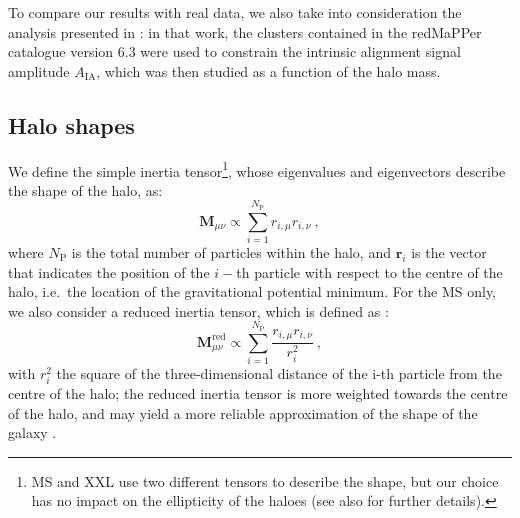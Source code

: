 \documentclass[a4paper,fleqn,usenatbib]{mnras}
\begin{document}
To compare our results with real data, we also take into consideration the analysis presented in \citet{vanUitertJoachimi2017}: in that work, the clusters contained in the redMaPPer catalogue \citep{Rykoffetal2014} version 6.3 were used to constrain the intrinsic alignment signal amplitude $A_{\mathrm{IA}}$, which was then studied as a function of the halo mass. 

\subsection{Halo shapes}
\label{subsec:haloshapes}
We define the simple inertia tensor\footnote{MS and XXL use two different tensors to describe the shape, but our choice has no impact on the ellipticity of the haloes (see also \citet{Bettetal2007} for further details).}, whose eigenvalues and eigenvectors describe the shape of the halo, as:
\begin{equation}
    \mathbf{M}_{\mu \nu} \propto \sum_{i=1}^{N_{\mathrm{P}}} r_{i, \mu} r_{i, \nu} \ ,
	\label{eq:sit}
\end{equation}
where $N_{\mathrm{P}}$ is the total number of particles within the halo, and $\mathbf{r}_{i}$ is the vector that indicates the position of the $i-$th particle with respect to the centre of the halo, i.e.\ the location of the gravitational potential minimum. For the MS only, we also consider a reduced inertia tensor, which is defined as \citep{Pereiraetal2008}:
\begin{equation}
    \mathbf{M}_{\mu \nu}^{\mathrm{red}} \propto \sum _{i=1}^{N_{\mathrm{P}}} \frac{r_{i, \mu} r_{i, \nu}}{r_i^2} \ ,
	\label{eq:rit}
\end{equation}
with $r_i^2$ the square of the three-dimensional distance of the i-th particle from the centre of the halo; the reduced inertia tensor is more weighted towards the centre of the halo, and may yield a more reliable approximation of the shape of the galaxy \citep{Joachimietal2013b, Chisarietal2015}. 
\end{document}
